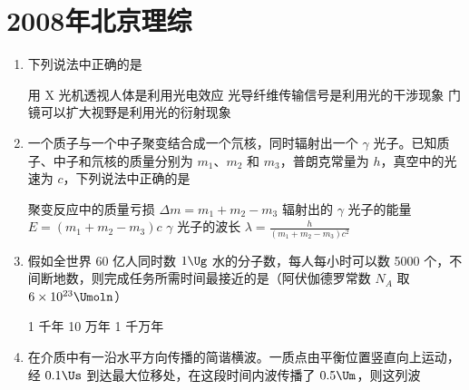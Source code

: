 \documentclass[\gkver]{gaokaozhenti}
\begin{document}
\chapter{2008年北京理综}

\begin{enumerate}
\item
下列说法中正确的是

{用 X 光机透视人体是利用光电效应}
{光导纤维传输信号是利用光的干涉现象}
{门镜可以扩大视野是利用光的衍射现象}


\item
一个质子与一个中子聚变结合成一个氘核，同时辐射出一个 $\gamma$ 光子。已知质子、中子和氘核的质量分别为 $m_{1}$、$m_{2}$ 和 $m_{3}$，普朗克常量为 $h$，真空中的光速为 $c$，下列说法中正确的是

{聚变反应中的质量亏损 $\Delta m=m_{1}+m_{2}-m_{3}$}
{辐射出的 $\gamma$ 光子的能量 $E=(m_{1}+m_{2}-m_{3})c$}
{$\gamma$ 光子的波长 $\lambda=\frac{h}{(m_{1}+m_{2}-m_{3})c^{2}}$}


\item
假如全世界 60 亿人同时数 $1\Ug$ 水的分子数，每人每小时可以数 5000 个，不间断地数，则完成任务所需时间最接近的是（阿伏伽德罗常数 $N_{A}$ 取 $6\times10^{23}\Umoln$）

{1 千年}
{10 万年}
{1 千万年}


\item
在介质中有一沿水平方向传播的简谐横波。一质点由平衡位置竖直向上运动，经 $0.1\Us$ 到达最大位移处，在这段时间内波传播了 $0.5\Um$，则这列波


\end{enumerate}
\end{document}
